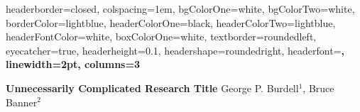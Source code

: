 \documentclass[landscape,a0paper,fontscale=0.285]{baposter}
\begin{document}
\begin{poster}
{
headerborder=closed, %
colspacing=1em, %
bgColorOne=white, %
bgColorTwo=white, %
borderColor=lightblue, %
headerColorOne=black, %
headerColorTwo=lightblue, %
headerFontColor=white, %
boxColorOne=white, %
textborder=roundedleft, %
eyecatcher=true, %
headerheight=0.1\textheight, %
headershape=roundedright, %
headerfont=\Large\bf\textsc, %
linewidth=2pt, %
columns=3
}

{\bf Unnecessarily Complicated Research Title} %
{\vspace{1em} George P. Burdell$^1$, Bruce Banner$^2$ \\
 } %

{}

{}

{}

{}

{}


\end{poster}
\end{document}
